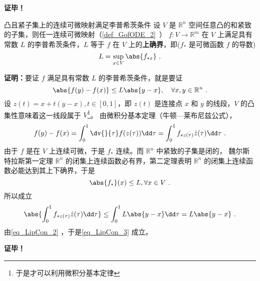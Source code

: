 \textbf{证毕！}

\begin{theorem}{凸且紧子集上的连续可微映射满足李普希茨条件}\label{the_LipCon_2}
设 $V$ 是 $\mathbb R^n$ 空间任意凸的和紧致的子集，则任一连续可微映射（\autoref{def_GofODE_2}~） $f:V\rightarrow \mathbb R^m$ 在 $V$ 上满足具有常数 $L$ 的李普希茨条件，$L$ 等于 $f$ 在 $V$ 上的\textbf{上确界}，即($f_*$ 是可微函数 $f$ 的导数)
\begin{equation}
L=\sup_{x\in V}\abs{f_{*x}}~.
\end{equation}
\end{theorem}
\textbf{证明：}要证 $f$ 满足具有常数 $L$ 的李普希茨条件，就是要证
\begin{equation}\label{eq_LipCon_3}
\abs{f(y)-f(x)}\leq L\abs{y-x},\quad\forall x,y\in\mathbb R^n~.
\end{equation}
设 $z(t)=x+t(y-x),t\in[0,1]$，即 $z(t)$ 是连接点 $x$ 和 $y$ 的线段，$V$ 的凸集性意味着这一线段属于 $V$\footnote{于是才可以利用微积分基本定律}。
由微积分基本定理（牛顿—莱布尼兹公式），
\begin{equation}\label{eq_LipCon_2}
f(y)-f(x)=\int_0^1\dv{}{\tau}f(z(\tau))\dd\tau=\int_0^1f_{*z(\tau)}\dot z(\tau)\dd\tau~.
\end{equation}
由于 $f$ 是在 $V$ 上连续可微，于是 $f_*$ 连续。而 $\mathbb R^n$ 中紧致的子集是闭的， 魏尔斯特拉斯第一定理 $\mathbb R^n$ 的闭集上连续函数必有界，第二定理表明 $\mathbb R^n$ 的闭集上连续函数必能达到其上下确界，于是
 \begin{equation}
 \abs{f_*}(x)\leq L ,\forall x\in V ~.
 \end{equation}
所以成立
\begin{equation}
\abs{\int_0^1f_{*z(\tau)}\dot z(\tau)\dd\tau}\leq\int_0^1L\abs{y-x}\dd\tau=L\abs{y-x}~.
\end{equation}
由\autoref{eq_LipCon_2} ，于是\autoref{eq_LipCon_3} 成立。

\textbf{证毕！}